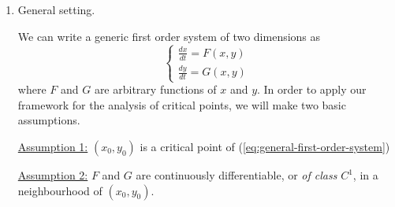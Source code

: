 \documentclass[11pt, letterpaper, oneside]{article}     %
\numberwithin{equation}{subsection}
\theoremstyle{definition}
\numberwithin{theorem}{section}
\theoremstyle{remark}
\begin{document}
\begin{enumerate}
  More generally,
  \begin{equation}
    \begin{cases}
      \frac{dx_1}{dt} = F(x_1,x_2)\\
      \frac{dx_1}{dt} = G(x_1,x_2)
    \end{cases}
    \implies\quad
    \frac{dx_2}{dx_1} = \frac{dx_2/dt}{dx_1/dt}
    = \frac{G(x_1,x_2)}{F(x_1,x_2)}.
  \end{equation}
  We have come up with a new differential equation independent of time parameter (so we can forget about it). Generally, we can solve this equation using methods from basic ODE theory (e.g. it's often separable, like in the special case above). We get solutions of the form $H(x_1,x_2) = c$. For example, in the special case $F/G = x_2 / (-x_1)$, we have $-x_2dx_2 = x_1dx_1$, and integrating both sides we get $x_1^2 + x_2^2 = c$. (The solutions are circles.) On the other hand, the matrix that generates this system is
  \begin{equation}
    A =
    \begin{pmatrix}
      0 & -1\\
      1 & 0
    \end{pmatrix},
  \end{equation}
  and we saw the circular solution curves for this system before.

  \medskip

\item General setting.

  We can write a generic first order system of two dimensions as
  \begin{equation}\label{eq:general-first-order-system}
    \begin{cases}
      \frac{dx}{dt} = F(x,y)\\
      \frac{dy}{dt} = G(x,y)
    \end{cases}
  \end{equation}
  where $F$ and $G$ are arbitrary functions of $x$ and $y$. In order to apply our framework for the analysis of critical points, we will make two basic assumptions.

  \underline{Assumption 1:} $(x_0,y_0)$ is a critical point of (\ref{eq:general-first-order-system})

  \underline{Assumption 2:} $F$ and $G$ are continuously differentiable, or \emph{of class} $C^1$, in a neighbourhood of $(x_0,y_0)$.


\end{enumerate}
\end{document}
